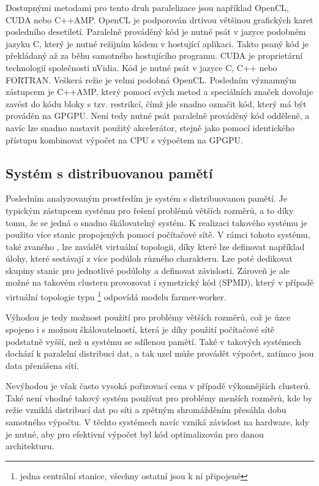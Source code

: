 \documentclass[]{thesiskiv}
\begin{document}
Dostupnými metodami pro tento druh paralelizace jsou například OpenCL, CUDA nebo C++AMP. OpenCL je podporován drtivou většinou grafických karet posledního desetiletí. Paralelně prováděný kód je nutné psát v jazyce podobném jazyku C, který je nutné  režijním kódem v hostující aplikaci. Takto psaný kód je překládaný až za běhu samotného hostujícího programu. CUDA je proprietární technologií společnosti nVidia. Kód je nutné psát v jazyce C, C++ nebo FORTRAN. Veškerá režie je velmi podobná OpenCL. Posledním významným zástupcem je C++AMP, který pomocí svých metod a speciálních značek dovoluje zavést do kódu bloky s tzv. restrikcí, čímž jde snadno označit kód, který má být prováděn na GPGPU. Není tedy nutné psát paralelně prováděný kód odděleně, a navíc lze snadno nastavit použitý akcelerátor, stejně jako pomocí identického přístupu kombinovat výpočet na CPU s výpočtem na GPGPU.

\subsection{Systém s distribuovanou pamětí}

Posledním analyzovaným prostředím je systém s distribuovanou pamětí. Je typickým zástupcem systému pro řešení problémů větších rozměrů, a to díky tomu, že se jedná o snadno škálovatelný systém. K realizaci takového systému je použito více stanic propojených pomocí počítačové sítě. V rámci tohoto systému, také zvaného , lze zavádět virtuální topologii, díky které lze definovat například úlohy, které sestávají z více podúloh různého charakteru. Lze poté dedikovat skupiny stanic pro jednotlivé podúlohy a definovat závislosti. Zároveň je ale možné na takovém clusteru provozovat i symetrický kód (SPMD), který v případě virtuální topologie typu \footnote{jedna centrální stanice, všechny ostatní jsou k ní připojené} odpovídá modelu farmer-worker.

Výhodou je tedy možnost použití pro problémy větších rozměrů, což je úzce spojeno i s možnou škálovatelností, která je díky použití počítačové sítě podstatně vyšší, než u systému se sdílenou pamětí. Také v takových systémech dochází k paralelní distribuci dat, a tak uzel může provádět výpočet, zatímco jsou data přenášena sítí.

Nevýhodou je však často vysoká pořizovací cena v případě výkonnějších clusterů. Také není vhodné takový systém používat pro problémy menších rozměrů, kde by režie vzniklá distribucí dat po síti a zpětným shromážděním přesáhla dobu samotného výpočtu. V těchto systémech navíc vzniká závislost na hardware, kdy je nutné, aby pro efektivní výpočet byl kód optimalizován pro danou architekturu.
\end{document}
